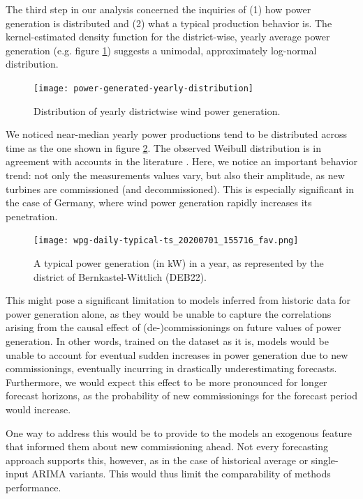 The third step in our analysis concerned the inquiries of (1) how power generation is distributed and (2) what a typical production behavior is.
The kernel-estimated density function for the district-wise, yearly average power generation (e.g. figure \ref{fig:yearly_power_generation}) suggests a unimodal, approximately log-normal distribution.

\begin{figure}[H]%
   \centering
    \caption{Distribution of yearly districtwise wind power generation.}
    \texttt{[image: power-generated-yearly-distribution]}
   \label{fig:yearly_power_generation}
\end{figure}

We noticed near-median yearly power productions tend to be distributed across time as the one shown in figure \ref{fig:deb22_production_2015}.
The observed Weibull distribution is in agreement with accounts in the literature \cite{blaabjerg2017electronics, engeland2017variability, he2014short-term}.
Here, we notice an important behavior trend: not only the measurements values vary, but also their amplitude, as new turbines are commissioned (and decommissioned).
This is especially significant in the case of Germany, where wind power generation rapidly increases its penetration.

\begin{figure}[H]%
   \centering
    \caption{A typical power generation (in kW) in a year, as represented by the district of Bernkastel-Wittlich (DEB22).}
    \texttt{[image: wpg-daily-typical-ts\_20200701\_155716\_fav.png]}
   \label{fig:deb22_production_2015}
\end{figure}

This might pose a significant limitation to models inferred from historic data for power generation alone, as they would be unable to capture the correlations arising from the causal effect of (de-)commissionings on future values of power generation.
In other words, trained on the dataset as it is, models would be unable to account for eventual sudden increases in power generation due to new commissionings, eventually incurring in drastically underestimating forecasts.
Furthermore, we would expect this effect to be more pronounced for longer forecast horizons, as the probability of new commissionings for the forecast period would increase.

One way to address this would be to provide to the models an exogenous feature that informed them about new commissioning ahead.
Not every forecasting approach supports this, however, as in the case of historical average or single-input ARIMA variants.
This would thus limit the comparability of methods performance.

